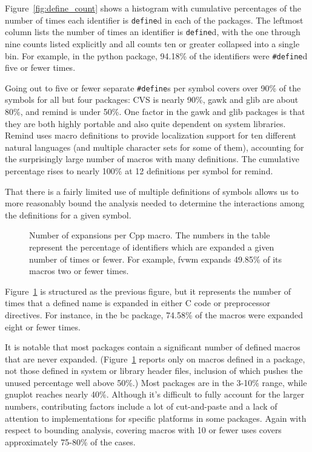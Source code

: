 \documentclass[11pt]{article}
\begin{document}
Figure~\ref{fig:define_count} shows a histogram with cumulative
percentages of the number of times each identifier is {\tt define}d
in each of the packages.  The leftmost column lists the number of
times an identifier is {\tt define}d, with the one through nine counts
listed explicitly and all counts ten or greater collapsed into a
single bin.  
For example, in the python package, 94.18\% of
the identifiers were {\tt \#define}d five or fewer times.  

Going out to five or fewer separate {\tt \#define}s per symbol covers
over 90\% of the symbols for all but four packages: CVS is nearly
90\%, gawk and glib are about 80\%, and remind is under 50\%.  One
factor in the gawk and glib packages is that they are both highly
portable and also quite dependent on system libraries.  Remind uses macro
definitions to provide localization support for ten different natural
languages (and multiple character sets for some of them), accounting for
the surprisingly large number of macros with many definitions.  The
cumulative percentage rises to nearly 100\% at 12 definitions per symbol
for remind.

That there is a fairly limited use of multiple definitions of symbols
allows us to more reasonably bound the analysis needed to determine
the interactions among the definitions for a given symbol.

\begin{figure}
{\small
  \setlength{\tabcolsep}{.25em}
}
\caption{Number of expansions per Cpp macro.  The numbers in the
  table represent the percentage of identifiers which are expanded a given
  number of times or fewer.  For example, fvwm expands 49.85\% of its
  macros two or fewer times.}
\label{fig:use_count}
\end{figure}

Figure~\ref{fig:use_count} is structured as the previous figure, but it
represents the number of times that a defined name is expanded in
either C code or preprocessor directives.  For instance, in the bc
package, 74.58\% of the macros were expanded eight or fewer times.

It is notable that most packages contain a significant number of defined
macros that are never expanded.  (Figure~\ref{fig:use_count} reports only
on macros defined in a package, not those defined in system or library
header files, inclusion of which pushes the unused percentage well above 50\%.)
Most packages are in the 3-10\% range, while gnuplot
reaches nearly 40\%.  Although it's difficult to fully account for the
larger numbers, contributing factors include a lot of cut-and-paste
and a lack of attention to implementations for specific platforms in
some packages.  Again with respect to bounding analysis, covering
macros with 10 or fewer uses covers approximately 75-80\% of the cases.
\end{document}
